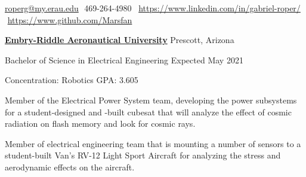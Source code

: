 \documentclass[letterpaper,ddMMMyyyy,nonstopmode]{simpleresumecv}
\makeatletter
\newcommand{\CVAuthor}{Gabriel Roper}
\newcommand{\LinkedInPage}{https://www.linkedin.com/in/gabriel-roper/}
\newcommand{\GithubPage}{https://www.github.com/Marsfan}
\newcommand{\emailAddress}{roperg@my.erau.edu}
\newcommand{\streetAddress}{}
\newcommand{\phoneNumber}{469-264-4980}
\makeatother
\begin{document}
	\Title{\CVAuthor}

	\begin{SubTitle}
		{\streetAddress}
		\par
		\href{mailto:\emailAddress}{\emailAddress}
		\BulletSymbol
		\,\,\phoneNumber\,
		\BulletSymbol
		\,\,\href{\LinkedInPage}{\url{\LinkedInPage}}
		\BulletSymbol
		\,\,\href{\GithubPage}{\url{\GithubPage}}
	\end{SubTitle}

	\begin{Body}



            \Entry
            \href{https://prescott.erau.edu}{\textbf{Embry-Riddle Aeronautical University}}
            \hfill Prescott, Arizona

            Bachelor of Science in Electrical Engineering
            \hfill Expected May 2021

            Concentration: Robotics
            \hfill GPA: 3.605





                {Member of the Electrical Power System team, developing the
                    power subsystems for a student-designed and -built
                    cubesat that will analyze the effect of cosmic radiation on
                    flash memory and look for cosmic rays.}
            \Gap

                {Member of electrical engineering team that is mounting a number of sensors
                    to a student-built Van's RV-12 Light Sport Aircraft for analyzing the
                    stress and aerodynamic effects on the aircraft.}
            \Gap



\end{Body}
\end{document}
